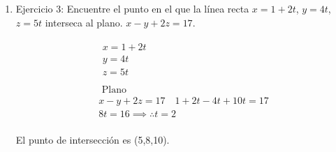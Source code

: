 \begin{enumerate}
    \item Ejercicio 3: Encuentre el punto en el que la línea recta $x=1+2t$, $y=4t$, $z=5t$ interseca al plano. $x-y+2z=17$.
        \begin{center}
            \begin{align*}
                \begin{matrix}
                    x = 1+2t \\ 
                    y = 4t \\ 
                    z= 5t \\ 
                \end{matrix} \\ 
                \text{  Plano  } \\ 
                x-y+2z = 17 \quad 1+2t-4t+10t = 17 \\ 
                8t = 16 \implies \therefore  t = 2 \\ 
            \end{align*}
        \end{center}
        El punto de intersección es (5,8,10).
    

\end{enumerate}
